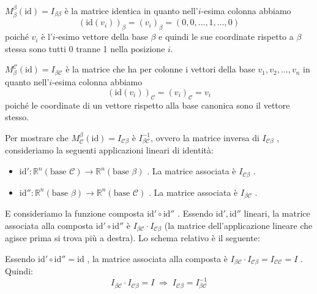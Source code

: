 \documentclass[
  a4paper,
]{article}
\providecommand{\tightlist}{%
  \setlength{\itemsep}{0pt}\setlength{\parskip}{0pt}}
\providecommand{\tightlist}{}
\begin{document}
\begin{proofbox}
\(M^{\beta}_{\beta}(\text{id}) = I_{\beta \beta}\) è la matrice identica
in quanto nell'\(i\)-esima colonna abbiamo \[
(\text{id}(v_i))_{\beta} = (v_i)_{\beta} = (0, 0, \dots, 1, \dots, 0)
\] poiché \(v_i\) è l'\(i\)-esimo vettore della base \(\beta\) e quindi
le sue coordinate rispetto a \(\beta\) stessa sono tutti 0 tranne 1
nella posizione \(i\).

\bigskip

\(M^{\mathcal{C}}_{\beta}(\text{id}) = I_{\beta \mathcal{C}}\) è la
matrice che ha per colonne i vettori della base \(v_1, v_2, ..., v_n\)
in quanto nell'\(i\)-esima colonna abbiamo \[
(\text{id}(v_i))_{\mathcal{C}} = (v_i)_{\mathcal{C}} = v_i
\] poiché le coordinate di un vettore rispetto alla base canonica sono
il vettore stesso.

\bigskip

Per mostrare che
\(M^{\beta}_{\mathcal{C}}(\text{id}) = I_{\mathcal{C} \beta}\) è
\(I_{\beta\mathcal{C}}^{-1}\), ovvero la matrice inversa di
\(I_{\mathcal{C} \beta}\) , consideriamo la seguenti applicazioni
lineari di identità:

\begin{itemize}
\tightlist
\item
  \(\text{id}' : \mathbb{R}^n (\text{base } \mathcal{C}) \to \mathbb{R}^n (\text{base } \beta)\)
  . La matrice associata è \(I_{\mathcal{C} \beta}\) .
\item
  \(\text{id}'' : \mathbb{R}^n (\text{base } \beta) \to \mathbb{R}^n (\text{base } \mathcal{C})\)
  . La matrice associata è \(I_{\beta \mathcal{C}}\) .
\end{itemize}

E consideriamo la funzione composta \(\text{id}' \circ \text{id}''\) .
Essendo \(\text{id}' ,\text{id}''\) lineari, la matrice associata alla
composta \(\text{id}' \circ \text{id}''\) è
\(I_{\beta \mathcal{C}} \cdot I_{\mathcal{C} \beta}\) (la matrice
dell'applicazione lineare che agisce prima si trova più a destra). Lo
schema relativo è il seguente:

\begin{center}
\end{center}

Essendo \(\text{id}' \circ \text{id}'' = \text{id}\) , la matrice
associata alla composta è
\(I_{\beta \mathcal{C}} \cdot I_{\mathcal{C} \beta} = I_{\mathcal{C} \mathcal{C}} = I\)
. Quindi: \[
I_{\beta \mathcal{C}} \cdot I_{\mathcal{C} \beta} = I \;\Longrightarrow\; I_{\mathcal{C} \beta} = I_{\beta \mathcal{C}}^{-1}
\]
\end{proofbox}
\end{document}
